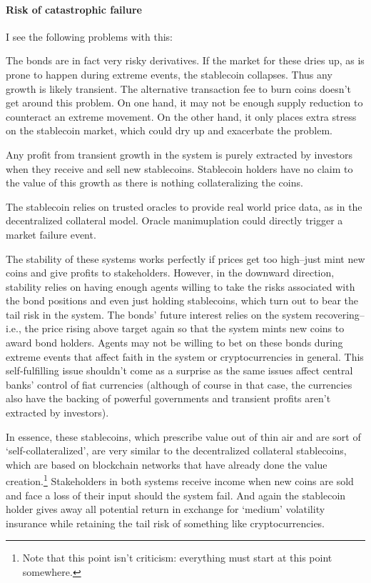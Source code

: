 \documentclass[10pt]{article}
\begin{document}
\paragraph{Risk of catastrophic failure} I see the following problems with this:
\begin{compactenum}
	\item The bonds are in fact very risky derivatives. If the market for these dries up, as is prone to happen during extreme events, the stablecoin collapses. Thus any growth is likely transient. The alternative transaction fee to burn coins doesn't get around this problem. On one hand, it may not be enough supply reduction to counteract an extreme movement. On the other hand, it only places extra stress on the stablecoin market, which could dry up and exacerbate the problem.
	\item Any profit from transient growth in the system is purely extracted by investors when they receive and sell new stablecoins. Stablecoin holders have no claim to the value of this growth as there is nothing collateralizing the coins.
	\item The stablecoin relies on trusted oracles to provide real world price data, as in the decentralized collateral model. Oracle manimuplation could directly trigger a market failure event.
\end{compactenum}


The stability of these systems works perfectly if prices get too high--just mint new coins and give profits to stakeholders. However, in the downward direction, stability relies on having enough agents willing to take the risks associated with the bond positions and even just holding stablecoins, which turn out to bear the tail risk in the system. The bonds' future interest relies on the system recovering--i.e., the price rising above target again so that the system mints new coins to award bond holders. Agents may not be willing to bet on these bonds during extreme events that affect faith in the system or cryptocurrencies in general. This self-fulfilling issue shouldn't come as a surprise as the same issues affect central banks' control of fiat currencies (although of course in that case, the currencies also have the backing of powerful governments and transient profits aren't extracted by investors).

In essence, these stablecoins, which prescribe value out of thin air and are sort of `self-collateralized', are very similar to the decentralized collateral stablecoins, which are based on blockchain networks that have already done the value creation.\footnote{Note that this point isn't criticism: everything must start at this point somewhere.} Stakeholders in both systems receive income when new coins are sold and face a loss of their input should the system fail. And again the stablecoin holder gives away all potential return in exchange for `medium' volatility insurance while retaining the tail risk of something like cryptocurrencies.
\end{document}

